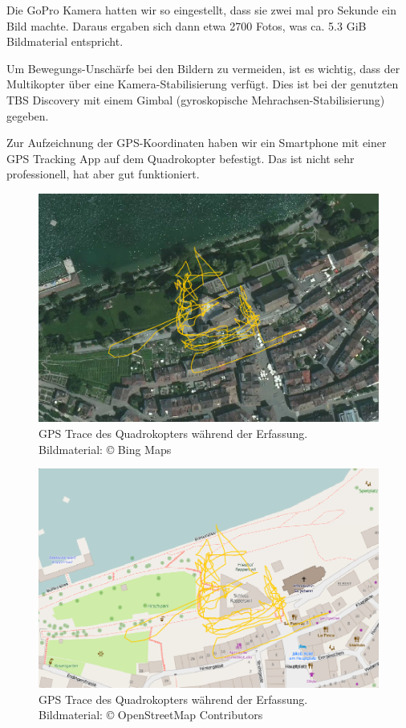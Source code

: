 Die GoPro Kamera hatten wir so eingestellt, dass sie zwei mal pro Sekunde ein
Bild machte. Daraus ergaben sich dann etwa 2700 Fotos, was ca. 5.3 GiB
Bildmaterial entspricht.

Um Bewegungs-Unschärfe bei den Bildern zu vermeiden, ist es wichtig, dass der
Multikopter über eine Kamera-Stabilisierung verfügt. Dies ist bei der genutzten
TBS Discovery mit einem Gimbal (gyroskopische Mehrachsen-Stabilisierung)
gegeben.

Zur Aufzeichnung der GPS-Koordinaten haben wir ein Smartphone mit einer GPS
Tracking App auf dem Quadrokopter befestigt. Das ist nicht sehr professionell,
hat aber gut funktioniert.

\begin{figure}[p]
	\centering
	\includegraphics[width=\textwidth]{images/gpstrace_satellite.png}
	\caption{GPS Trace des Quadrokopters während der Erfassung.\\Bildmaterial:
		\copyright{} Bing Maps}
	\label{img:gpstrace-satellite}
\end{figure}

\begin{figure}[p]
	\centering
	\includegraphics[width=\textwidth]{images/gpstrace_mapnik.png}
	\caption{GPS Trace des Quadrokopters während der Erfassung.\\Bildmaterial:
		\copyright{} OpenStreetMap Contributors}
	\label{img:gpstrace-mapnik}
\end{figure}

